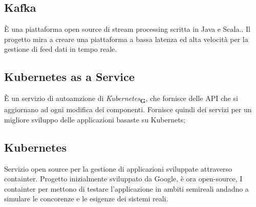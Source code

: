 \section{}
\subsection*{Kafka} È una piattaforma open source di stream processing scritta in Java e Scala.. Il progetto mira a creare una piattaforma a bassa latenza ed alta velocità per la gestione di feed dati in tempo reale.

\subsection*{Kubernetes as a Service} È un servizio di autoamzione di \textit{Kubernetes}\textsubscript{\textbf{G}}, che fornisce delle API che si aggiornano ad ogni modifica dei componenti. Fornisce quindi dei servizi per un migliore sviluppo delle applicazioni basaste su Kubernets;

\subsection*{Kubernetes} Servizio open source per la gestione di applicazioni sviluppate attraverso containter. Progetto inizialmente sviluppato da Google, è ora open-source, I containter per mettono di testare l'applicazione in ambiti semireali andadno a simulare le concorenze e le esigenze dei sistemi reali.
